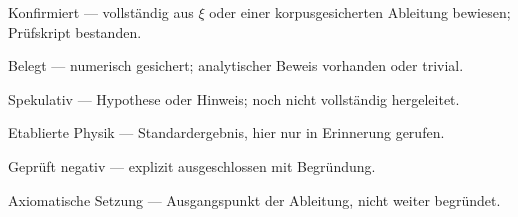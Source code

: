 \begin{description}[leftmargin=2.5em,style=sameline,itemsep=0.3em]
  \item[\textbf{[K]}] Konfirmiert — vollständig aus $\xi$ oder einer
    korpusgesicherten Ableitung bewiesen; Prüfskript bestanden.
  \item[\textbf{[B]}] Belegt — numerisch gesichert; analytischer Beweis
    vorhanden oder trivial.
  \item[\textbf{[S]}] Spekulativ — Hypothese oder Hinweis; noch nicht
    vollständig hergeleitet.
  \item[\textbf{[E]}] Etablierte Physik — Standardergebnis, hier nur
    in Erinnerung gerufen.
  \item[\textbf{[X]}] Geprüft negativ — explizit ausgeschlossen mit
    Begründung.
  \item[\textbf{[SETZUNG]}] Axiomatische Setzung — Ausgangspunkt der
    Ableitung, nicht weiter begründet.
\end{description}
